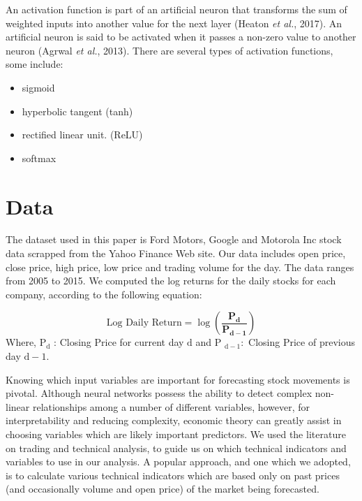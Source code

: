 An activation function is part of an artificial neuron that transforms the sum of weighted inputs into another value for the next layer (Heaton \textit{et al.}, 2017).  An artificial neuron is said to be activated when it passes a non-zero value to another neuron (Agrwal \textit{et al.}, 2013). There are several types of activation functions, some include:

\begin{itemize}
\item sigmoid
\item hyperbolic tangent (tanh)
\item rectified linear unit. (ReLU)
\item softmax
\end{itemize}



\section{Data}

The dataset used in this paper is Ford Motors, Google and Motorola Inc stock data scrapped from the Yahoo Finance Web site. Our data includes open price, close price, high price, low price and trading volume for the day. The data ranges from 2005 to 2015. We computed the log returns for the daily stocks for each company, according to the following equation:

\begin{equation}
\text{Log Daily Return} =  \log \left(\frac{\mathbf{P}_{\mathbf{d}}}{\mathbf{P}_{\mathbf{d - 1}}}\right)
\end{equation}
Where, $\mathrm{P}_{\mathrm{d}}$ : Closing Price for current day $\mathrm{d}$ and 
P $_{\mathrm{d}-1}:$ Closing Price of previous day $\mathrm{d}-1$.

Knowing which input variables are important for forecasting stock movements is pivotal. Although neural networks possess the ability to detect complex non-linear relationships among a number of different variables, however, for interpretability and reducing complexity, economic theory can greatly assist in choosing variables which are likely important predictors. We used the literature on trading and technical analysis, to guide us on which technical indicators and variables to use in our analysis. A popular approach, and one which we adopted, is to calculate various technical indicators which are based only on past prices (and occasionally volume and open price) of the market being forecasted. 

